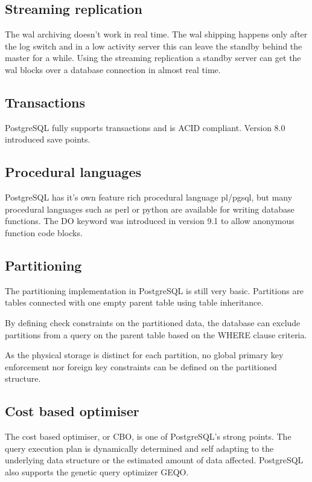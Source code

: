 \subsection{Streaming replication}
The wal archiving doesn't work in real time. The wal shipping happens only
after the log switch and in a low activity server this can leave the standby
behind the master for a while. Using the streaming replication a standby server can get the wal blocks over a database connection
in almost real time.


\subsection{Transactions}
PostgreSQL fully supports transactions and is ACID compliant.
Version 8.0 introduced save points.

\subsection{Procedural languages}
PostgreSQL has it's own feature rich procedural language pl/pgsql, but many procedural
languages such as perl or python are available for writing database functions.
The DO keyword was introduced in version 9.1 to allow anonymous function code
blocks.

\subsection{Partitioning}
The partitioning implementation in
PostgreSQL is still very basic. Partitions are tables connected with one
empty parent table using table inheritance.

By defining check constraints on the partitioned data, the database can
exclude partitions from a query on the parent table based on the WHERE
clause criteria.

As the physical storage is distinct for each partition, no global primary key
enforcement nor foreign key constraints can be defined on the partitioned
structure.

\subsection{Cost based optimiser}
The cost based optimiser, or CBO, is
one of PostgreSQL's strong points.
The query execution plan is dynamically determined and self adapting to the
underlying data structure or the estimated amount of data affected.
PostgreSQL also supports the genetic query optimizer GEQO.

